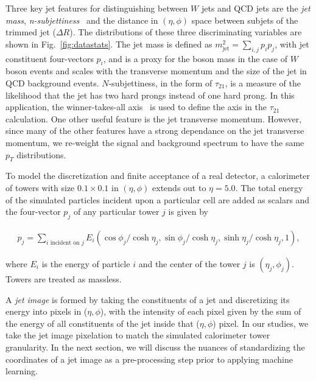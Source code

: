 Three key jet features for distinguishing between $W$ jets and QCD jets are the {\it jet mass}, {\it n-subjettiness}~\cite{nsub} and the distance in $(\eta,\phi)$ space between subjets of the trimmed jet ($\Delta R$).  The distributions of these three discriminating variables are shown in Fig.~\ref{fig:datastats}.   The jet mass is defined as $m_\text{jet}^2=\sum_{i,j} p_i p_j$, with jet constituent four-vectors $p_i$, and is a proxy for the boson mass in the case of $W$ boson events and scales with the transverse momentum and the size of the jet in QCD background events.  $N$-subjettiness, in the form of $\tau_{21}$, is a measure of the likelihood that the jet has two hard prongs instead of one hard prong.  In this application, the winner-takes-all axis~\cite{Larkoski:2014uqa} is used to define the axis in the $\tau_{21}$ calculation.  One other useful feature is the jet transverse momentum.  However, since many of the other features have a strong dependance on the jet transverse momentum, we re-weight the signal and background spectrum to have the same $p_T$ distributions.

To model the discretization and finite acceptance of a real detector, a calorimeter of towers with size $0.1\times 0.1$ in $(\eta,\phi)$ extends out to $\eta=5.0$.  The total energy of the simulated particles incident upon a particular cell are added as scalars and the four-vector $p_j$ of any particular tower $j$ is given by

\begin{align}
\label{eq:calo}
p_j = \sum_{i\text{ incident on $j$}}E_i(\cos\phi_j/\cosh \eta_j,\sin\phi_j/\cosh \eta_j,\sinh \eta_j/\cosh \eta_j,1),
\end{align}

\noindent where $E_i$ is the energy of particle $i$ and the center of the tower $j$ is $(\eta_j,\phi_j)$.  Towers are treated as massless.

 A {\it jet image} is formed by taking the constituents of a jet and discretizing its energy into pixels in ($\eta,\phi$), with the intensity of each pixel given by the sum of the energy of all constituents of the jet inside that ($\eta,\phi$) pixel.  In our studies, we take the jet image pixelation to match the simulated calorimeter tower granularity.  In the next section, we will discuss the nuances of standardizing the coordinates of a jet image as a pre-processing step prior to applying machine learning.  

